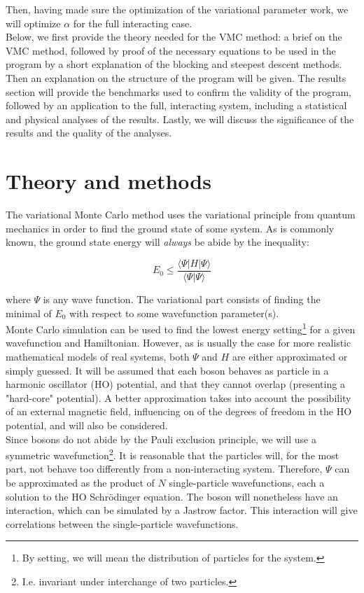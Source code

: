 \documentclass[english, a4paper]{article}
\begin{document}
Then, having made sure the optimization of the variational parameter work, we will optimize $\alpha$ for the full interacting case.\\
Below, we first provide the theory needed for the VMC method: a brief on the VMC method, followed by proof of the necessary equations to be used in the program by a short explanation of the blocking and steepest descent methods. 
Then an explanation on the structure of the program will be given. 
The results section will provide the benchmarks used to confirm the validity of the program, followed by an application to the full, interacting system, including a statistical and physical analyses of the results. 
Lastly, we will discuss the significance of the results and the quality of the analyses.

\section{Theory and methods}

The variational Monte Carlo method uses the variational principle from quantum mechanics in order to find the ground state of some system. As is commonly known, the ground state energy will \emph{always} be abide by the inequality:

\begin{equation}
	E_{0} \leq \frac{\langle \Psi|H|\Psi\rangle}{\langle\Psi|\Psi\rangle}
\end{equation}

where $\Psi$ is any wave function. The variational part consists of finding the minimal of $E_0$ with respect to some wavefunction parameter(s).\\
Monte Carlo simulation can be used to find the lowest energy setting\footnote{By setting, we will mean the distribution of particles for the system.} for a given wavefunction and Hamiltonian. However, as is usually the case for more realistic mathematical models of real systems, both $\Psi$ and $H$ are either approximated or simply guessed. It will be assumed that each boson behaves as particle in a harmonic oscillator (HO) potential, and that they cannot overlap (presenting a "hard-core" potential). A better approximation takes into account the possibility of an external magnetic field, influencing on of the degrees of freedom in the HO potential, and will also be considered.\\ 
Since bosons do not abide by the Pauli exclusion principle, we will use a symmetric wavefunction\footnote{I.e. invariant under interchange of two particles.}. It is reasonable that the particles will, for the most part, not behave too differently from a non-interacting system. Therefore, $\Psi$ can be approximated as the product of $N$ single-particle wavefunctions, each a solution to the HO Schr\"odinger equation. The boson will nonetheless have an interaction, which can be simulated by a Jastrow factor. This interaction will give correlations between the single-particle wavefunctions.
\end{document}
